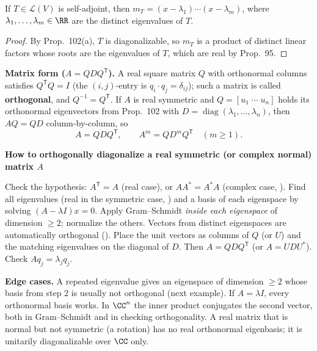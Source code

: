 \documentclass[10pt]{scrartcl}
\newcommand{\LL}{\mathcal L}\newcommand{\PP}{\mathcal P}\newcommand{\MM}{\mathcal M}
\newenvironment{methodbox}[1]{\begin{mdframed}[style=mdbluebox,linecolor=NavyBlue,backgroundcolor=NavyBlue!3]\textbf{\color{NavyBlue}#1}\par\vspace{2pt}}{\end{mdframed}}
\begin{document}
\begin{proposition*}
  If $T\in\LL(V)$ is self-adjoint, then $m_T = (x-\lambda_1)\cdots(x-\lambda_m)$, where $\lambda_1,\dots,\lambda_m\in\RR$ are the distinct eigenvalues of $T$.
\end{proposition*}
\begin{proof}
  By Prop.~102(a), $T$ is diagonalizable, so $m_T$ is a product of distinct linear factors  whose roots are the eigenvalues of $T$, which are real by Prop.~95.
\end{proof}

\noindent\textbf{Matrix form ($A=QDQ^{\mathsf T}$).} A real square matrix $Q$ with orthonormal columns satisfies $Q^{\mathsf T}Q=I$ (the $(i,j)$-entry is $q_i\cdot q_j=\delta_{ij}$); such a matrix is called \textbf{orthogonal}, and $Q^{-1}=Q^{\mathsf T}$. If $A$ is real symmetric and $Q=[u_1\;\cdots\;u_n]$ holds its orthonormal eigenvectors from Prop.~102 with $D=\operatorname{diag}(\lambda_1,\dots,\lambda_n)$, then $AQ=QD$ column-by-column, so
\[
  A = QDQ^{\mathsf T}, \qquad A^m = QD^m Q^{\mathsf T}\quad (m\ge1).
\]

\begin{methodbox}{How to orthogonally diagonalize a real symmetric (or complex normal) matrix $A$}
\begin{enumerate}[label=\arabic*.,leftmargin=1.5em,itemsep=2pt,topsep=2pt]
  \ii Check the hypothesis: $A^{\mathsf T}=A$ (real case), or $AA^*=A^*A$ (complex case, ).
  \ii Find all eigenvalues (real in the symmetric case, ) and a basis of each eigenspace by solving $(A-\lambda I)x=0$.
  \ii Apply Gram--Schmidt  \emph{inside each eigenspace} of dimension $\ge2$; normalize the others. Vectors from distinct eigenspaces are automatically orthogonal ().
  \ii Place the unit vectors as columns of $Q$ (or $U$) and the matching eigenvalues on the diagonal of $D$. Then $A=QDQ^{\mathsf T}$ (or $A=UDU^*$). Check $Aq_j=\lambda_jq_j$.
\end{enumerate}
\textbf{Edge cases.} A repeated eigenvalue gives an eigenspace of dimension $\ge2$ whose basis from step 2 is usually not orthogonal (next example). If $A=\lambda I$, every orthonormal basis works. In $\CC^n$ the inner product conjugates the second vector, both in Gram--Schmidt and in checking orthogonality. A real matrix that is normal but not symmetric (a rotation) has no real orthonormal eigenbasis; it is unitarily diagonalizable over $\CC$ only.
\end{methodbox}
\end{document}

